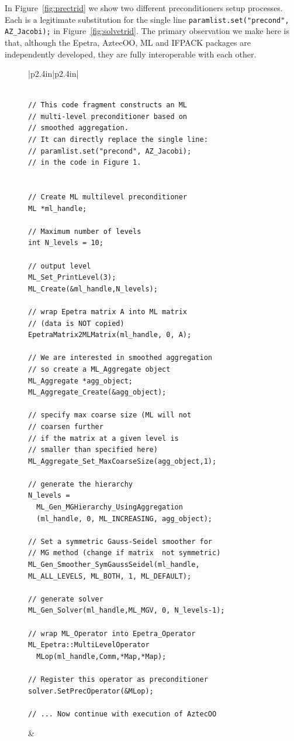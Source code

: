 \documentclass[acmtoms,acmnow]{acmtrans2m}
\begin{document}
In Figure~\ref{fig:prectrid} we show two different preconditioners
setup processes.  Each is a legitimate substitution for the single
line {\tt paramlist.set("precond", AZ\_Jacobi);} in
Figure~\ref{fig:solvetrid}.  The primary observation we make here is
that, although the Epetra, AztecOO, ML and IFPACK packages are
independently developed, they are fully interoperable with each other.
\begin{figure}
{\scriptsize
\begin{tabular}{|p{2.4in}|p{2.4in}|}\hline
\begin{verbatim}

// This code fragment constructs an ML
// multi-level preconditioner based on 
// smoothed aggregation.
// It can directly replace the single line:
// paramlist.set("precond", AZ_Jacobi);
// in the code in Figure 1.


// Create ML multilevel preconditioner
ML *ml_handle;

// Maximum number of levels 
int N_levels = 10;

// output level
ML_Set_PrintLevel(3);
ML_Create(&ml_handle,N_levels);

// wrap Epetra matrix A into ML matrix 
// (data is NOT copied)
EpetraMatrix2MLMatrix(ml_handle, 0, A);

// We are interested in smoothed aggregation
// so create a ML_Aggregate object
ML_Aggregate *agg_object;
ML_Aggregate_Create(&agg_object);

// specify max coarse size (ML will not 
// coarsen further 
// if the matrix at a given level is
// smaller than specified here)
ML_Aggregate_Set_MaxCoarseSize(agg_object,1);

// generate the hierarchy
N_levels = 
  ML_Gen_MGHierarchy_UsingAggregation
  (ml_handle, 0, ML_INCREASING, agg_object);

// Set a symmetric Gauss-Seidel smoother for 
// MG method (change if matrix  not symmetric)
ML_Gen_Smoother_SymGaussSeidel(ml_handle, 
ML_ALL_LEVELS, ML_BOTH, 1, ML_DEFAULT);

// generate solver
ML_Gen_Solver(ml_handle,ML_MGV, 0, N_levels-1);

// wrap ML_Operator into Epetra_Operator
ML_Epetra::MultiLevelOperator  
  MLop(ml_handle,Comm,*Map,*Map);

// Register this operator as preconditioner
solver.SetPrecOperator(&MLop);

// ... Now continue with execution of AztecOO
\end{verbatim}
&
\begin{verbatim}


\end{verbatim}
\end{tabular}}
\end{figure}
\end{document}

